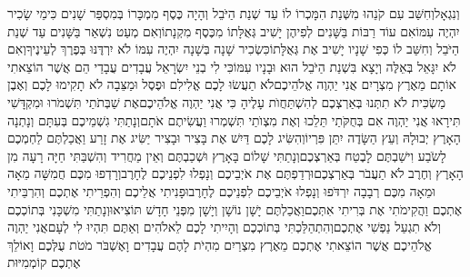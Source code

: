 \documentclass[../main/main.tex]{subfiles}
\begin{document}
\begin{multicols*}{\ncols}
וְנִגְאָל\PreVerseSpace{}וְחִשַּׁב עִם קֹנֵהוּ מִשְּׁנַת הִמָּכְרוֹ לוֹ עַד שְׁנַת הַיֹּבֵל וְהָיָה כֶּסֶף מִמְכָּרוֹ בְּמִסְפַּר שָׁנִים כִּימֵי שָׂכִיר יִהְיֶה עִמּוֹ\PreVerseSpace{}אִם עוֹד רַבּוֹת בַּשָּׁנִים לְפִיהֶן יָשִׁיב גְּאֻלָּתוֹ מִכֶּסֶף מִקְנָתוֹ\PreVerseSpace{}וְאִם מְעַט נִשְׁאַר בַּשָּׁנִים עַד שְׁנַת הַיֹּבֵל וְחִשַּׁב לוֹ כְּפִי שָׁנָיו יָשִׁיב אֶת גְּאֻלָּתוֹ\PreVerseSpace{}כִּשְׂכִיר שָׁנָה בְּשָׁנָה יִהְיֶה עִמּוֹ לֹא יִרְדֶּנּוּ בְּפֶרֶךְ לְעֵינֶיךָ\PreVerseSpace{}וְאִם לֹא יִגָּאֵל בְּאֵלֶּה וְיָצָא בִּשְׁנַת הַיֹּבֵל הוּא וּבָנָיו עִמּוֹ\PreVerseSpace{}כִּי לִי בְנֵי יִשְׂרָאֵל עֲבָדִים עֲבָדַי הֵם אֲשֶׁר הוֹצֵאתִי אוֹתָם מֵאֶרֶץ מִצְרָיִם אֲנִי יַהְוֶה אֱלֹהֵיכֶם\PreChapterSpace{}לֹא תַעֲשׂוּ לָכֶם אֱלִילִם וּפֶסֶל וּמַצֵּבָה לֹא תָקִימוּ לָכֶם וְאֶבֶן מַשְׂכִּית לֹא תִתְּנוּ בְּאַרְצְכֶם לְהִשְׁתַּחֲוֺת עָלֶיהָ כִּי אֲנִי יַהְוֶה אֱלֹהֵיכֶם\PreVerseSpace{}אֶת שַׁבְּתֹתַי תִּשְׁמֹרוּ וּמִקְדָּשִׁי תִּירָאוּ אֲנִי יַהְוֶה \ClosedSection{}אִם בְּחֻקֹּתַי תֵּלֵכוּ וְאֶת מִצְוֺתַי תִּשְׁמְרוּ וַעֲשִׂיתֶם אֹתָם\PreVerseSpace{}וְנָתַתִּי גִשְׁמֵיכֶם בְּעִתָּם וְנָתְנָה הָאָרֶץ יְבוּלָהּ וְעֵץ הַשָּׂדֶה יִתֵּן פִּרְיוֹ\PreVerseSpace{}וְהִשִּׂיג לָכֶם דַּיִשׁ אֶת בָּצִיר וּבָצִיר יַשִּׂיג אֶת זָרַע וַאֲכַלְתֶּם לַחְמְכֶם לָשֹׂבַע וִישַׁבְתֶּם לָבֶטַח בְּאַרְצְכֶם\PreVerseSpace{}וְנָתַתִּי שָׁלוֹם בָּאָרֶץ וּשְׁכַבְתֶּם וְאֵין מַחֲרִיד וְהִשְׁבַּתִּי חַיָּה רָעָה מִן הָאָרֶץ וְחֶרֶב לֹא תַעֲבֹר בְּאַרְצְכֶם\PreVerseSpace{}וּרְדַפְתֶּם אֶת אֹיְבֵיכֶם וְנָפְלוּ לִפְנֵיכֶם לֶחָרֶב\PreVerseSpace{}וְרָדְפוּ מִכֶּם חֲמִשָּׁה מֵאָה וּמֵאָה מִכֶּם רְבָבָה יִרְדֹּפוּ וְנָפְלוּ אֹיְבֵיכֶם לִפְנֵיכֶם לֶחָרֶב\PreVerseSpace{}וּפָנִיתִי אֲלֵיכֶם וְהִפְרֵיתִי אֶתְכֶם וְהִרְבֵּיתִי אֶתְכֶם וַהֲקִימֹתִי אֶת בְּרִיתִי אִתְּכֶם\PreVerseSpace{}וַאֲכַלְתֶּם יָשָׁן נוֹשָׁן וְיָשָׁן מִפְּנֵי חָדָשׁ תּוֹצִיאוּ\PreVerseSpace{}וְנָתַתִּי מִשְׁכָּנִי בְּתוֹכְכֶם וְלֹא תִגְעַל נַפְשִׁי אֶתְכֶם\PreVerseSpace{}וְהִתְהַלַּכְתִּי בְּתוֹכְכֶם וְהָיִיתִי לָכֶם לֵאלֹהִים וְאַתֶּם תִּהְיוּ לִי לְעָם\PreVerseSpace{}אֲנִי יַהְוֶה אֱלֹהֵיכֶם אֲשֶׁר הוֹצֵאתִי אֶתְכֶם מֵאֶרֶץ מִצְרַיִם מִהְיֹת לָהֶם עֲבָדִים וָאֶשְׁבֹּר מֹטֹת עֻלְּכֶם וָאוֹלֵךְ אֶתְכֶם קוֹמְמִיּוּת\OpenSection{}\par

\end{multicols*}
\end{document}
